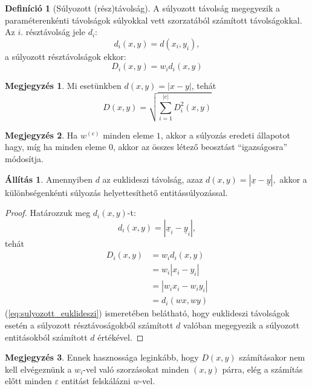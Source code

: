 \documentclass[twocolumn]{article}
\theoremstyle{definition}
\newtheorem{definition}{Definíció}[section]
\newtheorem{allitas}{Állítás}[section]
\newtheorem*{megj}{Megjegyzés}
\newcommand{\vect}[1]{ \underline{#1} }
\newcommand{\ent}[2]{ {#1}^{(#2)} }
\begin{document}
    \begin{definition}[Súlyozott (rész)távolság]
        A súlyozott távolság megegyezik a paraméterenkénti távolságok súlyokkal vett szorzatából számított távolságokkal. Az $i.$ résztávolság jele $d_i$:
        \begin{equation}
            d_i(x, y) = d(x_i, y_i),
        \end{equation}
        a súlyozott résztávolságok ekkor:
        \begin{equation}
            D_{i}(x, y) = w_id_i(x, y)
        \end{equation}
        \begin{megj}
            Mi esetünkben $d(x, y) = |x-y|$, tehát
            \begin{equation}\label{eq:sulyozott_euklideszi}
                D(x, y) = \sqrt{\sum_{i=1}^{|e|} D_i^2(x, y)} 
            \end{equation}
        \end{megj}
    \end{definition}
    
    \begin{megj}
        Ha $\ent w e$ minden eleme $1$, akkor a súlyozás eredeti állapotot hagy, míg ha minden eleme $0$, akkor az összes létező beosztást \enquote{igazságosra} módosítja.
    \end{megj}
    
    \begin{allitas}
        Amennyiben $d$ az euklideszi távolság, azaz $d(x,y) = |\vect x - \vect y|,$ akkor a különbségenkénti súlyozás helyettesíthető entitássúlyozással.
        \begin{proof}
            Határozzuk meg $d_i(x, y)$-t:
            \begin{equation}
                d_i(x,y) = |\vect x_i - \vect y_i|,
            \end{equation}
            tehát
            \begin{equation}
            \begin{split}
                D_i(x, y) &= w_i d_i(x, y) \\
                &= w_i |x_i - y_i| \\
                &= |w_i x_i - w_i y_i| \\
                &= d_i(wx, wy)
            \end{split}
            \end{equation}
            (\ref{eq:sulyozott_euklideszi}) ismeretében belátható, hogy euklideszi távolságok esetén a súlyozott résztávoságokból számított $d$ valóban megegyezik a súlyozott entitásokból számított $d$ értékével.
        \end{proof}
        \begin{megj}
            Ennek hasznossága leginkább, hogy $D(x, y)$ számításakor nem kell elvégeznünk a $w_i$-vel való szorzásokat minden $(x,y)$ párra, elég a számítás előtt minden $\varepsilon$ entitást felskálázni $w$-vel.
        \end{megj}
    \end{allitas}
    
\end{document}
